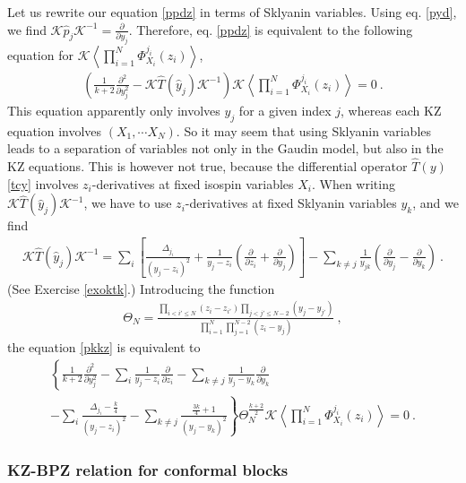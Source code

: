 \documentclass[12pt, a4paper, notitlepage, twoside]{report}
\numberwithin{equation}{section}
\theoremstyle{break}
\begin{document}
Let us rewrite our equation \eqref{ppdz} in terms of Sklyanin variables.
Using eq. \eqref{pyd}, we find
$\mathcal{K} \hat{p}_j \mathcal{K}^{-1}= {\frac{\partial}{\partial y_j}} $.
Therefore,  
eq. \eqref{ppdz} is equivalent to the following equation for $\mathcal{K}\left\langle \prod_{i=1}^N \Phi^{j_i}_{X_i}(z_i)\right\rangle$,
\begin{align}
 \left(\frac{1}{k+2}\frac{\partial ^2}{\partial y_j^2} - \mathcal{K} \hat{T}(\hat{y}_j) \mathcal{K}^{-1}\right)\mathcal{K}\left\langle \prod_{i=1}^N \Phi^{j_i}_{X_i}(z_i)\right\rangle  = 0\ .
\label{pkkz}
\end{align}
This equation apparently only involves $y_j$ for a given index $j$, whereas each KZ equation involves $(X_1,\cdots X_N)$. 
So it may seem that using Sklyanin variables leads to a separation of variables not only in the Gaudin model, but also
in the KZ equations. 
This is however not true, because the differential operator $\hat{T}(y)$ \eqref{tcy} involves $z_i$-derivatives at fixed isospin variables $X_i$.
When writing $\mathcal{K} \hat{T}(\hat{y}_j) \mathcal{K}^{-1}$, we have to use $z_i$-derivatives at fixed Sklyanin variables $y_k$, and we find
\begin{align}
\mathcal{K} \hat{T}(\hat{y}_j) \mathcal{K}^{-1} = \sum_i\left[\frac{\Delta_{j_i}}{(y_j-z_i)^2}+ \frac{1}{y_j-z_i}\left({\frac{\partial}{\partial z_i}}+{\frac{\partial}{\partial y_j}}\right)\right]-\sum_{k\neq j}\frac{1}{y_{jk}}\left({\frac{\partial}{\partial y_j}}-{\frac{\partial}{\partial y_k}}\right)\ .
\label{dtyj}
\end{align}
(See Exercise \ref{exoktk}.) 
Introducing the function
\begin{align}
 \Theta_N = \frac{\prod_{i<i'\leq N}(z_i-z_{i'})\prod_{j<j'\leq N-2}(y_j-y_{j'})}{\prod_{i=1}^N\prod_{j=1}^{N-2}(z_i-y_j)}\ ,
\end{align}
the equation \eqref{pkkz} is equivalent to 
\begin{multline}
 \left\{\frac{1}{k+2}  \frac{\partial^2}{\partial y_j^2} - \sum_i\frac{1}{y_j-z_i}{\frac{\partial}{\partial z_i}} -\sum_{k\neq j}\frac{1}{y_j-y_k} {\frac{\partial}{\partial y_k}}
\right. \\ \left.
 -\sum_i\frac{\Delta_{j_i}-\frac{k}{4}}{(y_j-z_i)^2}  -\sum_{k\neq j}\frac{\frac{3k}{4}+1}{(y_j-y_k)^2}   \right\} \Theta_N^{\frac{k+2}{2}}\mathcal{K}\left\langle \prod_{i=1}^N \Phi^{j_i}_{X_i}(z_i)\right\rangle = 0\ .
 \label{vskz}
\end{multline}

\subsubsection{KZ-BPZ relation for conformal blocks}
\end{document}
